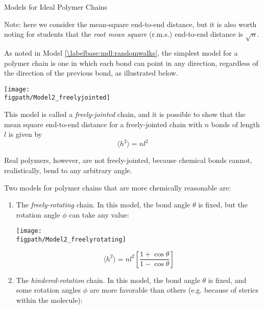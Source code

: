 \begin{activity}{Models for Ideal Polymer Chains}
\begin{ctqs}
\begin{enumerate}
\begin{solution}[1.5in]{}
					Note: here we consider the mean-square end-to-end distance, but it is also worth noting for students that the \emph{root mean square} (r.m.s.) end-to-end distance is $\sqrt{n}$.
				
				\end{solution}
		\end{enumerate}
		

\end{ctqs}

\begin{model}
\label{\labelbase:mdl:chainmodels}

	As noted in Model \ref{\labelbase:mdl:randomwalks}, the simplest model for a polymer chain is one in which each bond can point in any direction, regardless of the direction of the previous bond, as illustrated below.
	
		\centerline{\texttt{[image: \\figpath/Model2\_freelyjointed]}}
	
	This model is called a \emph{freely-jointed} chain, and it is possible to show that the mean square end-to-end distance for a freely-jointed chain with $n$ bonds of length $l$ is given by
	\begin{equation*}
		\langle h^2\rangle =nl^2
	\end{equation*}
	
	Real polymers, however, are not freely-jointed, because chemical bonds cannot, realistically, bend to any arbitrary angle.
	
	Two models for polymer chains that are more chemically reasonable are:
	
	\begin{enumerate}
		\item The \emph{freely-rotating} chain.  In this model, the bond angle $\theta$ is fixed, but the rotation angle $\phi$ can take any value:
		
			\begin{minipage}[c]{0.45\textwidth}
				\centerline{\texttt{[image: \\figpath/Model2\_freelyrotating]}}
			\end{minipage}\begin{minipage}[c]{0.45\textwidth}
				\begin{equation*}
					\langle h^2\rangle = n l^2 \left[\frac{1+\cos\theta}{1-\cos\theta}\right]
				\end{equation*}
			\end{minipage}
		
		\item The \emph{hindered-rotation} chain.  In this model, the bond angle $\theta$ is fixed, and some rotation angles $\phi$ are more favorable than others (e.g. because of sterics within the molecule):
		

\end{enumerate}
\end{model}
\end{activity}
